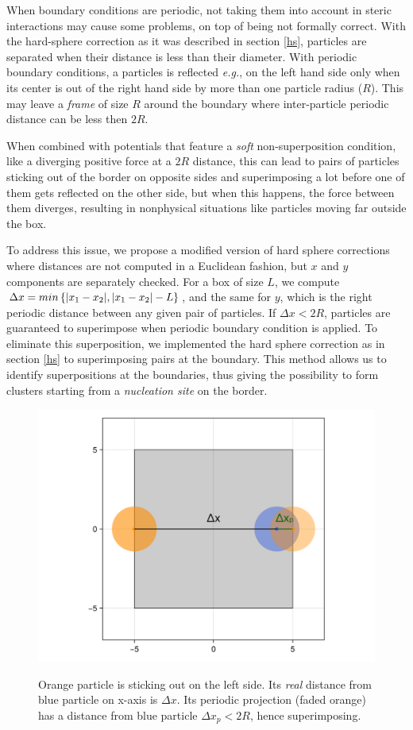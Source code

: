 \documentclass[../../master_thesis_np.tex]{subfiles}
\begin{document}
	When boundary conditions are periodic, not taking them into account in steric interactions may cause some problems, on top of being not formally correct.
	With the hard-sphere correction as it was described in section \ref{hs}, particles are separated when their distance is less than their diameter.
	With periodic boundary conditions, a particles is reflected {\it e.g.}, on the left hand side only when its center is out of the right hand side by more than one particle radius ($R$).
	This may leave a \emph{frame} of size $R$ around the boundary where inter-particle periodic distance can be less then $2R$. 
	
	When combined with potentials that feature a \emph{soft} non-superposition condition, like a diverging positive force at a $2R$ distance, this can lead to pairs of particles sticking out of the border on opposite sides and superimposing a lot before one of them gets reflected on the other side, but when this happens, the force between them diverges, resulting in nonphysical situations like particles moving far outside the box.
	
	To address this issue, we propose a modified version of hard sphere corrections where distances are not computed in a Euclidean fashion, but $x$ and $y$ components are separately checked.
	For a box of size $L$, we compute $\Delta x = min \left\{ \abs{x_1-x_2}, \abs{x_1-x_2}-L \right\}$, and the same for $y$, which is the right periodic distance between any given pair of particles.
	If $\Delta x < 2R$, particles are guaranteed to superimpose when periodic boundary condition is applied.
	To eliminate this superposition, we implemented the hard sphere correction as in section \ref{hs} to superimposing pairs at the boundary.
	This method allows us to identify superpositions at the boundaries, thus giving the possibility to form clusters starting from a \emph{nucleation site} on the border. 
	
	\begin{figure}[htp]
		\centering
		\includegraphics[width = \textwidth]{periodic_hs.png}
		\label{fig:periodic_hs}
		\caption{Orange particle is sticking out on the left side. Its \emph{real} distance from blue particle on x-axis is $\Delta x$. Its periodic projection (faded orange) has a distance from blue particle $\Delta x_p < 2R$, hence superimposing.}
	\end{figure}
	
\end{document}
